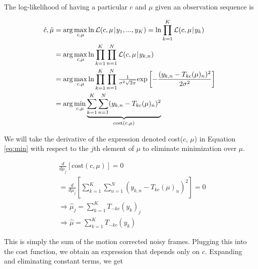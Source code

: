 \documentclass{article}
\newcommand\lpipe{\mkern1.5mu{|}\mkern1.5mu}
\begin{document}

The log-likelihood of having a particular $c$ and $\mu$ given an observation sequence is

\begin{align}
  \hat{c}, \hat{\mu} &= \arg \max_{c, \mu} \ln \mathcal{L}(c, \mu \lpipe y_1, ..., y_K) = \ln \prod_{k=1}^K \mathcal{L}(c, \mu \lpipe y_k) \nonumber \\
  &=\arg \max_{c, \mu} \ln \prod_{k=1}^K \prod_{n=1}^N \mathcal{L}(c, \mu \lpipe y_{k,n}) \nonumber \\
  &=\arg \max_{c, \mu} \ln \prod_{k=1}^K \prod_{n=1}^N \tfrac{1}{\sigma^2 \sqrt{2 \pi}} \text{exp} \left[- \frac{(y_{k,n} - T_{kc}(\mu)_n)^2}{2\sigma^2}\right] \nonumber \\
  &=\arg \min_{c, \mu} \underbrace{\sum_{k=1}^K \sum_{n=1}^N (y_{k,n} - T_{kc}(\mu)_n)^2}_{\text{cost}(c, \mu)} \label{eq:min}
\end{align}

We will take the derivative of the expression denoted cost($c$, $\mu$) in Equation \ref{eq:min} with respect to the $j$th element of $\mu$ to eliminate minimization over $\mu$.


\begin{align}
  &\frac{d}{d\mu_j}\left[\text{cost}(c, \mu)\right] = 0 \nonumber \\
  &=\frac{d}{d\mu_j}\left[\sum_{k=1}^K \sum_{n=1}^N (y_{k,n} - T_{kc}(\mu)_n)^2\right] = 0 \nonumber  \\
  &\Longrightarrow \hat{\mu}_j = \sum_{k=1}^K T_{-kc}(y_k)_j \nonumber  \\
  &\Longrightarrow \hat{\mu} = \sum_{k=1}^K T_{-kc}(y_k) \label{eq:mu}
\end{align}

This is simply the sum of the motion corrected noisy frames.  Plugging this into the cost function, we obtain an expression that depends only on $c$.  Expanding and eliminating constant terms, we get
\end{document}
